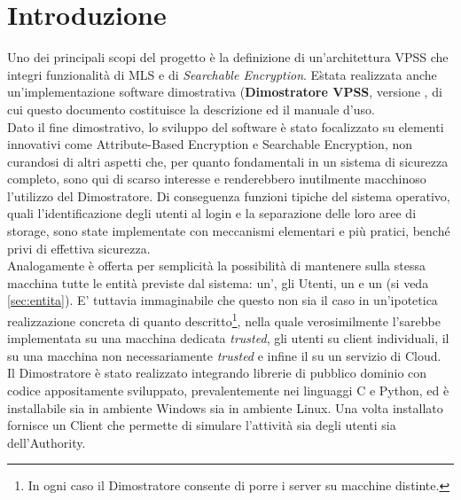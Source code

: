\documentclass[a4paper,twoside,10pt,openany]{scrbook}
\begin{document}
\chapter{Introduzione}\label{sec:intro}
%
Uno dei principali scopi del progetto è la definizione di un'architettura \ac{VPSS} che integri funzionalità di \ac{MLS} e di \textit{Searchable Encryption}. E\` stata realizzata anche un'implementazione software dimostrativa (\textbf{Dimostratore \ac{VPSS}}, versione \textbf{\versioneDimostratore}, di cui questo documento costituisce la descrizione ed il manuale d'uso.\\
%
Dato il fine dimostrativo, lo sviluppo del software è stato focalizzato su elementi innovativi come Attribute-Based Encryption e Searchable Encryption, non curandosi di altri aspetti che, per quanto fondamentali in un sistema di sicurezza completo, sono qui di scarso interesse e renderebbero inutilmente macchinoso l'utilizzo del Dimostratore. Di conseguenza funzioni tipiche del sistema operativo, quali l'identificazione degli utenti al login e la separazione delle loro aree di storage, sono state implementate con meccanismi elementari e più pratici, benché privi di effettiva sicurezza.\\
%
Analogamente è offerta per semplicità la possibilità di mantenere sulla stessa macchina tutte le entità previste dal sistema: un'\auth, gli Utenti, un \sa e un \sr (si veda \ref{sec:entita}). E' tuttavia immaginabile che questo non sia il caso in un'ipotetica realizzazione concreta di quanto descritto\footnote{In ogni caso il Dimostratore consente di porre i server su macchine distinte.}, nella quale verosimilmente l'\auth sarebbe implementata su una macchina dedicata \textit{trusted}, gli utenti su client individuali, il \sr su una macchina non necessariamente \textit{trusted} e infine il \sa su un servizio di Cloud.\\
%
Il Dimostratore è stato realizzato integrando librerie di pubblico dominio con codice appositamente sviluppato, prevalentemente nei linguaggi C e Python, ed è installabile sia in ambiente Windows sia in ambiente Linux. Una volta installato fornisce un Client che permette di simulare l'attività sia degli utenti sia dell'Authority.
%
\end{document}
